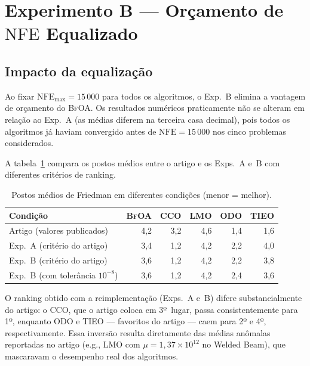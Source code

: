 \documentclass[12pt, a4paper]{article}
\newcommand{\alg}[1]{\textsc{#1}}
\newcommand{\nfe}{\mathrm{NFE}}
\begin{document}
\section{Experimento B — Orçamento de $\nfe$ Equalizado}

\subsection{Impacto da equalização}

Ao fixar $\nfe_{\max} = 15\,000$ para todos os algoritmos, o Exp.~B
elimina a vantagem de orçamento do \alg{BfOA}. Os resultados numéricos
praticamente não se alteram em relação ao Exp.~A (as médias diferem
na terceira casa decimal), pois todos os algoritmos já haviam
convergido antes de $\nfe = 15\,000$ nos cinco problemas considerados.

A tabela~\ref{tab:rank_cmp} compara os postos médios entre o artigo e
os Exps.~A e~B com diferentes critérios de ranking.

\begin{table}[h!]
\centering
\caption{Postos médios de Friedman em diferentes condições (menor = melhor).}
\label{tab:rank_cmp}
\small
\begin{tabular}{lrrrrr}
\toprule
Condição & \alg{BfOA} & \alg{CCO} & \alg{LMO} & \alg{ODO} & \alg{TIEO} \\
\midrule
Artigo (valores publicados)       & 4{,}2 & 3{,}2 & 4{,}6 & 1{,}4 & 1{,}6 \\
Exp.~A (critério do artigo)       & 3{,}4 & 1{,}2 & 4{,}2 & 2{,}2 & 4{,}0 \\
Exp.~B (critério do artigo)       & 3{,}6 & 1{,}2 & 4{,}2 & 2{,}2 & 3{,}8 \\
Exp.~B (com tolerância $10^{-8}$) & 3{,}6 & 1{,}2 & 4{,}2 & 2{,}4 & 3{,}6 \\
\bottomrule
\end{tabular}
\end{table}

O ranking obtido com a reimplementação (Exps.~A e~B) difere
substancialmente do artigo: o \alg{CCO}, que o artigo coloca em
3º~lugar, passa consistentemente para 1º, enquanto \alg{ODO} e
\alg{TIEO} — favoritos do artigo — caem para 2º e 4º, respectivamente.
Essa inversão resulta diretamente das médias anômalas reportadas no
artigo (e.g., \alg{LMO} com $\mu = 1{,}37\times10^{12}$ no Welded
Beam), que mascaravam o desempenho real dos algoritmos.
\end{document}
